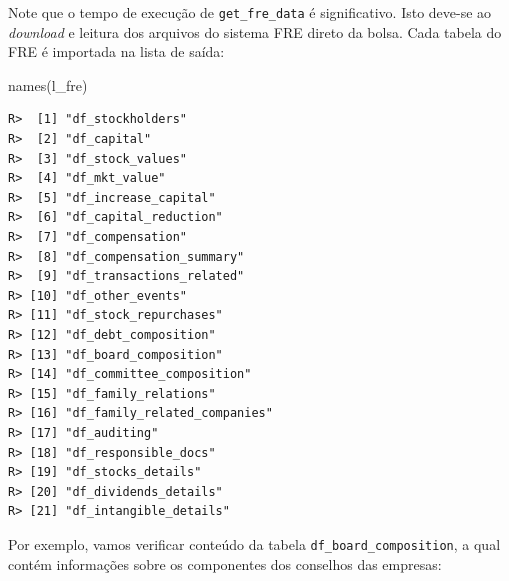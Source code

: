 \documentclass[
  11pt,
]{book}
\newenvironment{Shaded}{\begin{snugshade}}{\end{snugshade}}
\newcommand{\FunctionTok}[1]{\textcolor[rgb]{0,0,0}{#1}}
\newcommand{\NormalTok}[1]{#1}
\newcommand{\SpecialCharTok}[1]{\textcolor[rgb]{0,0,0}{#1}}
\begin{document}
Note que o tempo de execução de \texttt{get\_fre\_data} é significativo. Isto deve-se ao \emph{download} e leitura dos arquivos do sistema FRE direto da bolsa. Cada tabela do FRE é importada na lista de saída:

\begin{Shaded}
\begin{Highlighting}[]
\FunctionTok{names}\NormalTok{(l\_fre)}
\end{Highlighting}
\end{Shaded}

\begin{verbatim}
R>  [1] "df_stockholders"            
R>  [2] "df_capital"                 
R>  [3] "df_stock_values"            
R>  [4] "df_mkt_value"               
R>  [5] "df_increase_capital"        
R>  [6] "df_capital_reduction"       
R>  [7] "df_compensation"            
R>  [8] "df_compensation_summary"    
R>  [9] "df_transactions_related"    
R> [10] "df_other_events"            
R> [11] "df_stock_repurchases"       
R> [12] "df_debt_composition"        
R> [13] "df_board_composition"       
R> [14] "df_committee_composition"   
R> [15] "df_family_relations"        
R> [16] "df_family_related_companies"
R> [17] "df_auditing"                
R> [18] "df_responsible_docs"        
R> [19] "df_stocks_details"          
R> [20] "df_dividends_details"       
R> [21] "df_intangible_details"
\end{verbatim}

Por exemplo, vamos verificar conteúdo da tabela \texttt{df\_board\_composition}, a qual contém informações sobre os componentes dos conselhos das empresas:

\begin{Shaded}
\end{Shaded}
\end{document}

